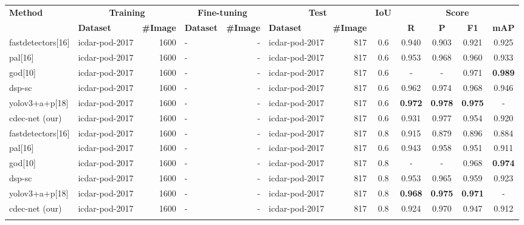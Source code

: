 \documentclass[a4paper,conference]{IEEEtran}
\begin{document}
\begin{table*}[ht!]
\addtolength{\tabcolsep}{-3.0pt}
\begin{center}
\begin{tabular}{|l| l | r|l |r|l|r| c| c c c c|} \hline
\textbf{Method} &\multicolumn{2}{|c|}{\textbf{Training}} &\multicolumn{2}{|c|}{\textbf{Fine-tuning}} &\multicolumn{2}{|c|}{\textbf{Test}} &\textbf{IoU} & \multicolumn{4}{|c|}{\textbf{Score}} \\ \cline{2-7} \cline{9-12}
  &\textbf{Dataset} &\textbf{\#Image} &\textbf{Dataset} &\textbf{\#Image} &\textbf{Dataset} &\textbf{\#Image} &  &\textbf{R} &\textbf{P} &\textbf{F1} &\textbf{mAP} \\ \hline
{\sc f}ast{\sc d}etectors[16] &{\sc icdar-pod}-2017 &1600 &- &- &{\sc icdar-pod}-2017 &817 &0.6 &0.940 &0.903 &0.921 &0.925 \\
{\sc pal}[16] &{\sc icdar-pod}-2017 &1600 &- &- &{\sc icdar-pod}-2017 &817 &0.6 &0.953 &0.968 &0.960 &0.933 \\ 
{\sc god}[10] &{\sc icdar-pod}-2017 &1600 &- &- &{\sc icdar-pod}-2017 &817 &0.6 &- &- &0.971 &\textbf{0.989} \\ 
{\sc dsp-sc}~\cite{li2018page} &{\sc icdar-pod}-2017 &1600 &- &- &{\sc icdar-pod}-2017 &817 &0.6 &0.962 &0.974 &0.968 &0.946 \\
{\sc yolo}v3+{\sc a}+{\sc p}[18] &{\sc icdar-pod}-2017 &1600 &- &- &{\sc icdar-pod}-2017 &817 &0.6 &\textbf{0.972} &\textbf{0.978} &\textbf{0.975} &- \\ 
{\sc cd}e{\sc c-n}et (our) &{\sc icdar-pod}-2017 &1600 &- &- &{\sc icdar-pod}-2017 &817 &0.6 &0.931 & 0.977 & 0.954 & 0.920\\ \hhline{|=|=|=|=|=|=|=|=|====|}
{\sc f}ast{\sc d}etectors[16] &{\sc icdar-pod}-2017 &1600 &- &- &{\sc icdar-pod}-2017 &817 &0.8 &0.915 &0.879 &0.896 &0.884 \\
{\sc pal}[16] &{\sc icdar-pod}-2017 &1600 &- &- &{\sc icdar-pod}-2017 &817 &0.6 &0.943 &0.958 &0.951 &0.911 \\
{\sc god}[10] &{\sc icdar-pod}-2017 &1600 &- & -&{\sc icdar-pod}-2017 &817 &0.8 &- &- &0.968 &\textbf{0.974} \\
{\sc dsp-sc}~\cite{li2018page} &{\sc icdar-pod}-2017 &1600 &- &- &{\sc icdar-pod}-2017 &817 &0.8 &0.953 &0.965 &0.959 &0.923 \\ 
{\sc yolo}v3+{\sc a}+{\sc p}[18] &{\sc icdar-pod}-2017 &1600 &- &- &{\sc icdar-pod}-2017 &817 &0.8 &\textbf{0.968} &\textbf{0.975} &\textbf{0.971} &- \\
{\sc cd}e{\sc c-n}et (our) &{\sc icdar-pod}-2017 &1600 &- &- &{\sc icdar-pod}-2017 &817 &0.8 &0.924 &0.970 &0.947 &0.912 \\ \hhline{|=|=|=|=|=|=|=|=|====|} 

\end{tabular}
\end{center}
\end{table*}
\end{document}
